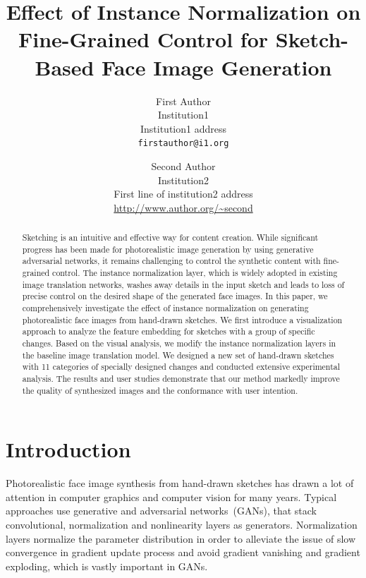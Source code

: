 \documentclass[10pt,twocolumn,letterpaper]{article}
\begin{document}
\title{Effect of Instance Normalization on Fine-Grained Control for Sketch-Based Face Image Generation}

\author{First Author\\
Institution1\\
Institution1 address\\
{\tt\small firstauthor@i1.org}
\and
Second Author\\
Institution2\\
First line of institution2 address\\
{\small\url{http://www.author.org/~second}}
}

\maketitle

\begin{abstract}
	Sketching is an intuitive and effective way for content creation. While significant progress has been made for photorealistic image generation by using generative adversarial networks, it remains challenging to control the synthetic content with fine-grained control.  
	The instance normalization layer, which is widely adopted in existing image translation networks, washes away details in the input sketch and leads to loss of precise control on the desired shape of the generated face images.
	In this paper, we comprehensively investigate the effect of instance normalization on generating photorealistic face images from hand-drawn sketches.
	We first introduce a visualization approach to analyze the feature embedding for sketches with a group of specific changes.  
	Based on the visual analysis, we modify the instance normalization layers in the baseline image translation model. 
	We designed a new set of hand-drawn sketches with 11 categories of specially designed changes and conducted extensive experimental analysis.  
	The results and user studies demonstrate that our method markedly improve the quality of synthesized images and the conformance with user intention.    
\end{abstract}

\section{Introduction}
Photorealistic face image synthesis from hand-drawn sketches has drawn a lot of attention in computer graphics and computer vision for many years. Typical approaches use generative and adversarial networks~(GANs)\cite{gan}, that  stack convolutional, normalization and nonlinearity layers as generators. Normalization layers normalize the parameter distribution in order to alleviate the issue of slow convergence in gradient update process and avoid gradient vanishing and gradient exploding,  which is vastly important in GANs.
\end{document}
